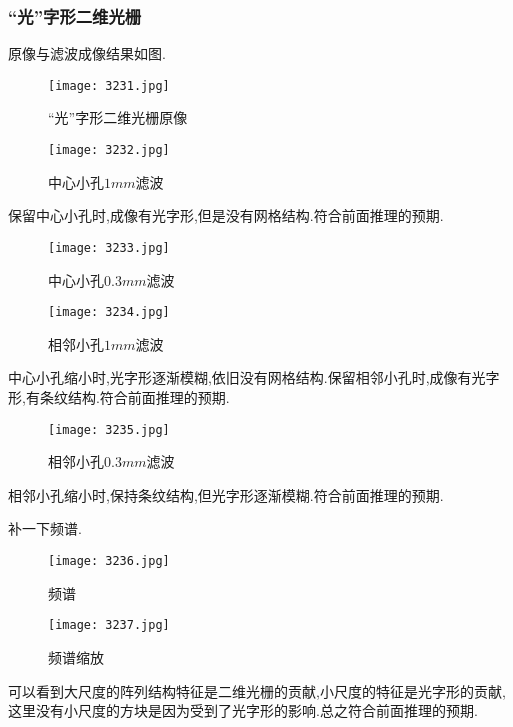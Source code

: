 \documentclass[10pt]{ctexart}
\begin{document}
\subsubsection{“光”字形二维光栅}
原像与滤波成像结果如图.
\begin{figure}[H]
\begin{minipage}[t]{0.5\linewidth}
\centering
\texttt{[image: 3231.jpg]}
\caption{“光”字形二维光栅原像}
\end{minipage}
\hfill
\begin{minipage}[t]{0.5\linewidth}
\centering
\texttt{[image: 3232.jpg]}
\caption{中心小孔$1mm$滤波}
\end{minipage}
\end{figure}
保留中心小孔时,成像有光字形,但是没有网格结构.符合前面推理的预期.
\begin{figure}[H]
\begin{minipage}[t]{0.5\linewidth}
\centering
\texttt{[image: 3233.jpg]}
\caption{中心小孔$0.3mm$滤波}
\end{minipage}
\hfill
\begin{minipage}[t]{0.5\linewidth}
\centering
\texttt{[image: 3234.jpg]}
\caption{相邻小孔$1mm$滤波}
\end{minipage}
\end{figure}
中心小孔缩小时,光字形逐渐模糊,依旧没有网格结构.保留相邻小孔时,成像有光字形,有条纹结构.符合前面推理的预期.
\begin{figure}[H]
\centering
\texttt{[image: 3235.jpg]}
\caption{相邻小孔$0.3mm$滤波}
\end{figure}
相邻小孔缩小时,保持条纹结构,但光字形逐渐模糊.符合前面推理的预期.

补一下频谱.
\begin{figure}[H]
\begin{minipage}[t]{0.5\linewidth}
\centering
\texttt{[image: 3236.jpg]}
\caption{频谱}
\end{minipage}
\hfill
\begin{minipage}[t]{0.5\linewidth}
\centering
\texttt{[image: 3237.jpg]}
\caption{频谱缩放}
\end{minipage}
\end{figure}
可以看到大尺度的阵列结构特征是二维光栅的贡献,小尺度的特征是光字形的贡献,这里没有小尺度的方块是因为受到了光字形的影响.总之符合前面推理的预期.
\end{document}
